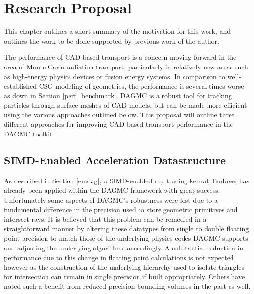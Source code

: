 \documentclass[12pt, a4paper]{article}
\begin{document}
\section{Research Proposal}%
\label{research_proposal}

This chapter outlines a short summary of the motivation for this work, and outlines the work to be done supported by previous work of the author.

The performance of CAD-based transport is a concern moving forward in the area of Monte Carlo radiation transport, particularly in relatively new areas such as high-energy physics devices or fusion energy systems. In comparison to well-established CSG modeling of geometries, the performance is several times worse as down in Section \ref{perf_benchmark}. DAGMC is a robust tool for tracking particles through surface meshes of CAD models, but can be made more efficient using the various approaches outlined below. This proposal will outline three different approaches for improving CAD-based transport performance in the DAGMC toolkit.

\subsection{SIMD-Enabled Acceleration Datastructure}

As described in Section \ref{emdag}, a SIMD-enabled ray tracing kernal, Embree, has already been applied within the DAGMC framework with great success. Unfortunately some aspects of DAGMC's robustness were lost due to a fundamental difference in the precision used to store geometric primitives and intersect rays. It is believed that this problem can be remedied in a straightforward manner by altering these datatypes from single to double floating point precision to match those of the underlying physics codes DAGMC supports and adjusting the underlying algorithms accordingly. A substantial reduction in performance due to this change in floating point calculations is not expected however as the construction of the underlying hierarchy used to isolate triangles for intersection can remain in single precision if built appropriately. Others have noted such a benefit from reduced-precision bounding volumes in the past as well\cite{Mahovsky_2005}.


\end{document}
